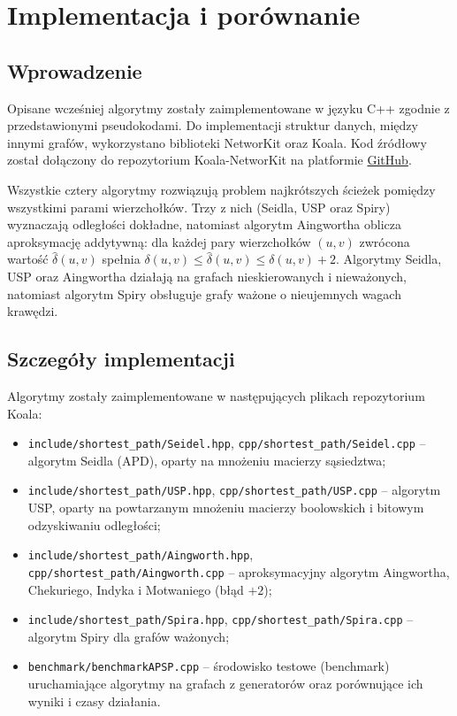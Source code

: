 \chapter{Implementacja i porównanie}

\section{Wprowadzenie}

Opisane wcześniej algorytmy zostały zaimplementowane w języku C++ zgodnie
z przedstawionymi pseudokodami. Do implementacji struktur danych, między innymi grafów, 
wykorzystano biblioteki NetworKit oraz Koala. Kod źródłowy został dołączony
do repozytorium Koala-NetworKit na platformie \href{https://github.com/krzysztof-turowski/koala-networkit/pull/55}{GitHub}.

Wszystkie cztery algorytmy rozwiązują problem najkrótszych ścieżek pomiędzy
wszystkimi parami wierzchołków.
Trzy z nich (Seidla, USP oraz Spiry) wyznaczają odległości dokładne, natomiast
algorytm Aingwortha oblicza aproksymację addytywną: dla każdej pary
wierzchołków $(u,v)$ zwrócona wartość $\hat{\delta}(u,v)$ spełnia
$\delta(u,v) \le \hat{\delta}(u,v) \le \delta(u,v) + 2$. Algorytmy Seidla, USP oraz Aingwortha
działają na grafach nieskierowanych i nieważonych, natomiast algorytm Spiry
obsługuje grafy ważone o nieujemnych wagach krawędzi.

\section{Szczegóły implementacji}

Algorytmy zostały zaimplementowane w następujących plikach repozytorium Koala:
\begin{itemize}
    \item \texttt{include/shortest\_path/Seidel.hpp}, \texttt{cpp/shortest\_path/Seidel.cpp}
          -- algorytm Seidla (APD), oparty na mnożeniu macierzy sąsiedztwa;
    \item \texttt{include/shortest\_path/USP.hpp}, \texttt{cpp/shortest\_path/USP.cpp}
          -- algorytm USP, oparty na powtarzanym mnożeniu macierzy boolowskich
          i bitowym odzyskiwaniu odległości;
    \item \texttt{include/shortest\_path/Aingworth.hpp}, \texttt{cpp/shortest\_path/Aingworth.cpp}
          -- aproksymacyjny algorytm Aingwortha, Chekuriego, Indyka i Motwaniego (błąd $+2$);
    \item \texttt{include/shortest\_path/Spira.hpp}, \texttt{cpp/shortest\_path/Spira.cpp}
          -- algorytm Spiry dla grafów ważonych;
    \item \texttt{benchmark/benchmarkAPSP.cpp}
          -- środowisko testowe (benchmark) uruchamiające algorytmy na grafach
          z generatorów oraz porównujące ich wyniki i czasy działania.
\end{itemize}

